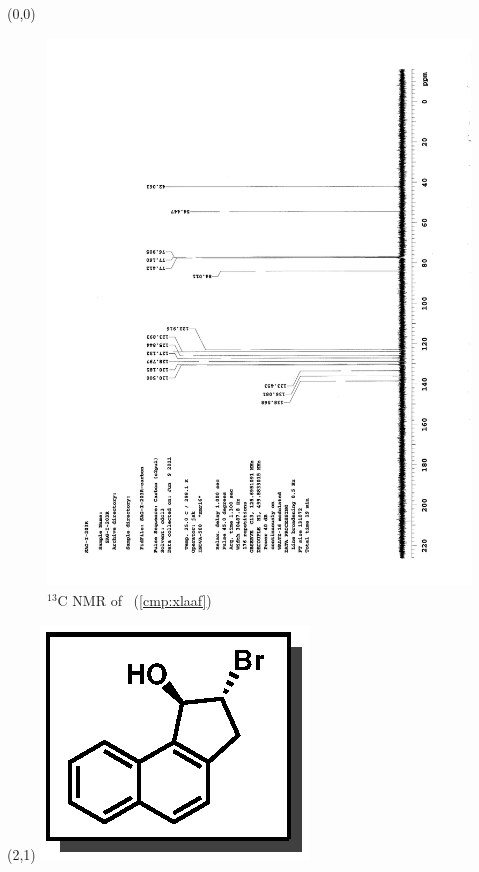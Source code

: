 \clearpage
\begin{textblock}{20}(0,0)
\begin{figure}[htb]
\caption{$^{13}$C NMR of  \CMPxlaaf\ (\ref{cmp:xlaaf})}
\includegraphics[scale=0.75, trim = 0mm 0mm 0mm 5mm,
clip]{chp_asymmetric/images/nmr/xlaafC}
\vspace{-100pt}
\end{figure}
\end{textblock}
\begin{textblock}{1}(2,1)
\includegraphics[scale=0.8, angle=90]{chp_asymmetric/images/xlaaf}
\end{textblock}
\clearpage

